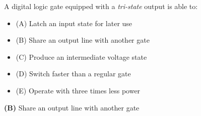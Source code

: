 


A digital logic gate equipped with a {\it tri-state} output is able to:

\begin{itemize}
\item{(A)} Latch an input state for later use
\vskip 5pt 
\item{(B)} Share an output line with another gate
\vskip 5pt 
\item{(C)} Produce an intermediate voltage state
\vskip 5pt 
\item{(D)} Switch faster than a regular gate
\vskip 5pt 
\item{(E)} Operate with three times less power
\end{itemize}







{\bf (B)} Share an output line with another gate
 











